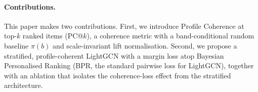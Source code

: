\paragraph{Contributions.} This paper makes two contributions. First, we introduce Profile Coherence at top-$k$ ranked items (PC@$k$), a coherence metric with a band-conditional random baseline $\pi(b)$ and scale-invariant lift normalisation. Second, we propose a stratified, profile-coherent LightGCN with a margin loss atop Bayesian Personalised Ranking (BPR, the standard pairwise loss for LightGCN), together with an ablation that isolates the coherence-loss effect from the stratified architecture.
